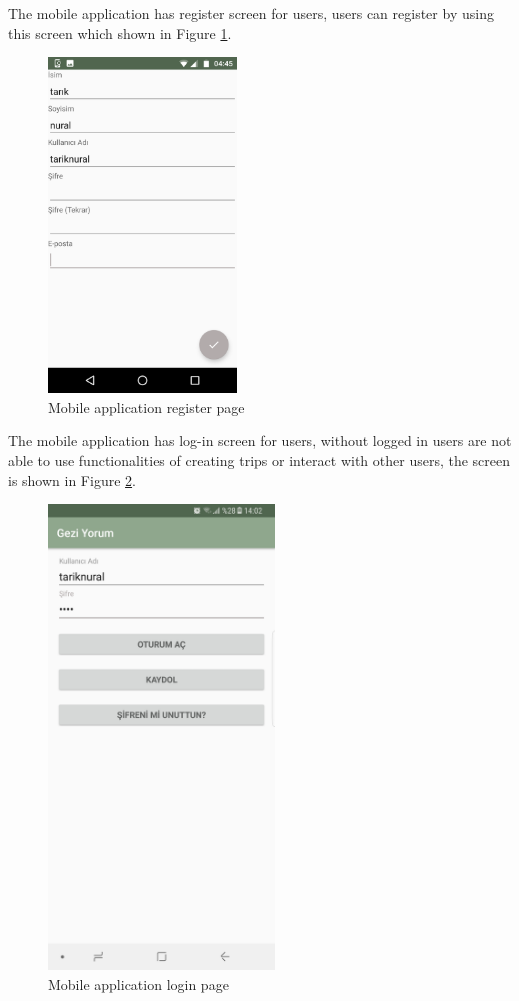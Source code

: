 The mobile application has register screen for users, users can register by using this screen which shown in Figure \ref{fig:phoneRegister}.

\begin{figure}[!htbp]
\centering
\includegraphics[width=50mm,scale=0.5]{projectChapters/images/phoneRegister.png}
\caption{Mobile application register page}
\label{fig:phoneRegister}
\end{figure}

\newpage

The mobile application has log-in screen for users, without logged in users are not able to use functionalities of creating trips or interact with other users, the screen is shown in Figure \ref{fig:phoneLogin}.  
\begin{figure}[!htbp]
\centering
\includegraphics[width=60mm,scale=0.6]{projectChapters/images/phoneLogin.png}
\caption{Mobile application login page}
\label{fig:phoneLogin}
\end{figure}

